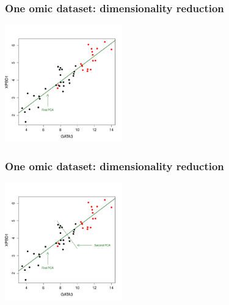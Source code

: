 \documentclass[10pt,xcolor=dvipsnames]{beamer}\usepackage[]{graphicx}\usepackage[]{color}
\newenvironment{knitrout}{}{} %
\begin{document}
\begin{frame}[fragile]\frametitle{One omic dataset: dimensionality reduction}

\begin{knitrout}\footnotesize
{}\color{fgcolor}

{\centering \includegraphics[width=2in]{figure/plot_pca_2-1} 

}



\end{knitrout}

\end{frame}


\begin{frame}[fragile]\frametitle{One omic dataset: dimensionality reduction}

\begin{knitrout}\footnotesize
{}\color{fgcolor}

{\centering \includegraphics[width=2in]{figure/plot_pca_3-1} 

}



\end{knitrout}

\end{frame}
\end{document}
